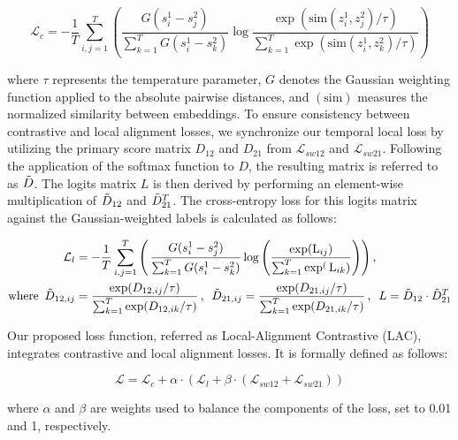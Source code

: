 \begin{equation}
    \mathcal{L}_c = - \frac{1}{T} \sum_{i, j=1}^T \left( \frac{G(s_i^1 - s_j^2)}{\sum_{k=1}^T G(s_i^1 - s_k^2)} \log \frac{\exp(\text{sim}(z_i^1, z_j^2) / \tau)}{\sum_{k=1}^T \exp(\text{sim}(z_i^1, z_k^2) / \tau)} \right)
\end{equation}

where $\tau$ represents the temperature parameter, $G$ denotes the Gaussian weighting function applied to the absolute pairwise distances, and $(\text{sim})$ measures the normalized similarity between embeddings.
To ensure consistency between contrastive and local alignment losses, we synchronize our temporal local loss by utilizing the primary score matrix $D_{12}$ and $D_{21}$ from $\mathcal{L}_{sw12}$ and $\mathcal{L}_{sw21}$.
Following the application of the softmax function to $D$, the resulting matrix is referred to as $\Tilde{D}$.
The logits matrix \(L\) is then derived by performing an element-wise multiplication of \(\Tilde{D}_{12}\) and \(\Tilde{D}_{21}^T\). 
The cross-entropy loss for this logits matrix against the Gaussian-weighted labels is calculated as follows:


\begin{align*}
\mathcal{L}_l &= -\frac{1}{T} \sum_{i, j=1}^T  \left(\, \frac{G(s_i^1 - s_j^2)}{\sum_{k=1}^T G(s_i^1 - s_k^2)} \log \left( \frac{\exp(\text{L}_{ij})}{\sum_{k=1}^T \exp^(\text{L}_{ik})} \right) \right), \\
\text{where} 
\,\ \Tilde{D}_{12, ij} & = \frac{\exp(D_{12, ij}/\tau)}{\sum_{k=1}^T \exp(D_{12, ik}/\tau)} \,,
\,\ \Tilde{D}_{21, ij} = \frac{\exp(D_{21, ij}/\tau)}{\sum_{k=1}^T \exp(D_{21, ik}/\tau)} \,,
\,\ L = \Tilde{D}_{12} \cdot \Tilde{D}_{21}^T
\end{align*}

Our proposed loss function, referred as Local-Alignment Contrastive (LAC), integrates contrastive and local alignment losses. It is formally defined as follows:

\begin{equation}
    \mathcal{L} = \mathcal{L}_c + \alpha \cdot (\mathcal{L}_l + \beta \cdot (\mathcal{L}_{sw12} + \mathcal{L}_{sw21}))
\end{equation}

where \(\alpha\) and \(\beta\) are weights used to balance the components of the loss, set to 0.01 and 1, respectively.


